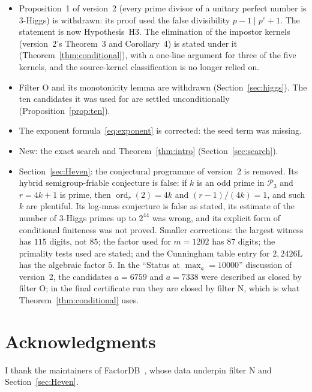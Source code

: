 \documentclass[11pt]{amsart}
\theoremstyle{plain}
\theoremstyle{definition}
\begin{document}
\begin{itemize}[leftmargin=*]
\item Proposition~1 of version~2 (every prime divisor of a unitary perfect
number is 3-Higgs) is withdrawn: its proof used the false divisibility
$p-1\mid p^e+1$.  The statement is now Hypothesis~H3.  The elimination of the
impostor kernels (version~2's Theorem~3 and Corollary~4) is stated under it
(Theorem~\ref{thm:conditional}), with a one-line argument for three of the five
kernels, and the source-kernel classification is no longer relied on.
\item Filter O and its monotonicity lemma are withdrawn
(Section~\ref{sec:higgs}).  The ten candidates it was used for are settled
unconditionally (Proposition~\ref{prop:ten}).
\item The exponent formula~\eqref{eq:exponent} is corrected: the seed term was
missing.
\item New: the exact search and Theorem~\ref{thm:intro}
(Section~\ref{sec:search}).
\item Section~\ref{sec:Heven}: the conjectural programme of version~2 is
removed.  Its hybrid semigroup-friable conjecture is false: if $k$ is an odd
prime in $\mathcal P_3$ and $r=4k+1$ is prime, then $\operatorname{ord}_r(2)=4k$
and $(r-1)/(4k)=1$, and such $k$ are plentiful.  Its log-mass conjecture is
false as stated, its estimate of the number of 3-Higgs primes up to $2^{44}$
was wrong, and its explicit form of conditional finiteness was not proved.
Smaller corrections: the largest witness has $115$ digits, not $85$; the
factor used for $m=1202$ has $87$ digits; the primality tests used are stated;
and the Cunningham table entry for $2,2426\mathrm L$ has the algebraic factor
$5$.  In the ``Status at $\max_a=10000$'' discussion of version~2, the
candidates $a=6759$ and $a=7338$ were described as closed by filter O; in the
final certificate run they are closed by filter N, which is what
Theorem~\ref{thm:conditional} uses.
\end{itemize}

\section*{Acknowledgments}

I thank the maintainers of FactorDB~\cite{FactorDB}, whose data underpin
filter N and Section~\ref{sec:Heven}.
\end{document}
